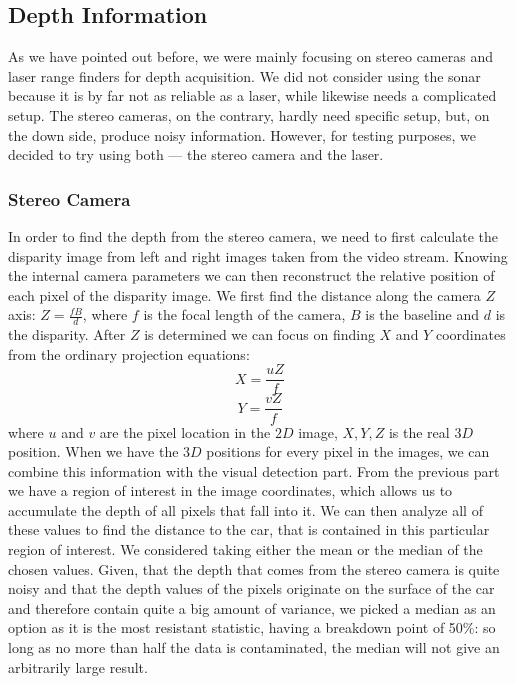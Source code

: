     \subsection{Depth Information}\label{sub:depth_information}
        As we have pointed out before, we were mainly focusing on stereo cameras and laser range finders for depth acquisition. We did not consider using the sonar because it is by far not as reliable as a laser, while likewise needs a complicated setup. The stereo cameras, on the contrary, hardly need specific setup, but, on the down side, produce noisy information. However, for testing purposes, we decided to try using both --- the stereo camera and the laser.
        \subsubsection{Stereo Camera}\label{ssub:stereo_camera}
            In order to find the depth from the stereo camera, we need to first calculate the disparity image from left and right images taken from the video stream.
            Knowing the internal camera parameters we can then reconstruct the relative position of each pixel of the disparity image.
            We first find the distance along the camera $Z$ axis: $Z = \frac{fB}{d}$, where $f$ is the focal length of the camera, $B$ is the baseline and $d$ is the disparity.
            After $Z$ is determined we can focus on finding $X$ and $Y$ coordinates from the ordinary projection equations:
            $$X = \frac{uZ}{f}$$
            $$Y = \frac{vZ}{f}$$
            where $u$ and $v$ are the pixel location in the $2D$ image, $X, Y, Z$ is the real $3D$ position.
            When we have the $3D$ positions for every pixel in the images, we can combine this information with the visual detection part. From the previous part we have a region of interest in the image coordinates, which allows us to accumulate the depth of all pixels that fall into it. We can then analyze all of these values to find the distance to the car, that is contained in this particular region of interest.
            We considered taking either the mean or the median of the chosen values. Given, that the depth that comes from the stereo camera is quite noisy and that the depth values of the pixels originate on the surface of the car and therefore contain quite a big amount of variance, we picked a median as an option as it is the most resistant statistic, having a breakdown point of 50$\%$: so long as no more than half the data is contaminated, the median will not give an arbitrarily large result.
